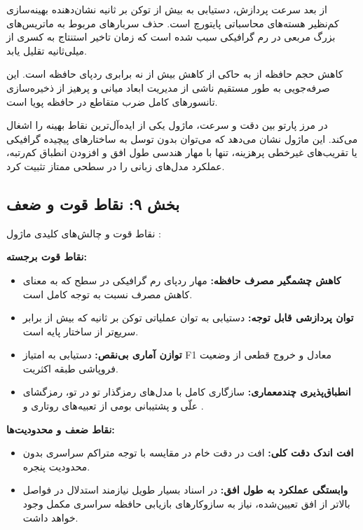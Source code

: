 از بعد سرعت پردازش، دستیابی به بیش از  توکن بر ثانیه نشان‌دهنده بهینه‌سازی کم‌نظیر هسته‌های محاسباتی پایتورچ است. حذف سربارهای مربوط به ماتریس‌های بزرگ مربعی در رم گرافیکی سبب شده است که زمان تاخیر استنتاج  به کسری از میلی‌ثانیه تقلیل یابد.

کاهش حجم حافظه از  به  حاکی از کاهش بیش از نه برابری ردپای حافظه است. این صرفه‌جویی به طور مستقیم ناشی از مدیریت ابعاد میانی و پرهیز از ذخیره‌سازی تانسورهای کامل ضرب متقاطع در حافظه پویا است.

در مرز پارتو بین دقت و سرعت، ماژول  یکی از ایده‌آل‌ترین نقاط بهینه را اشغال می‌کند. این ماژول نشان می‌دهد که می‌توان بدون توسل به ساختارهای پیچیده گرافیکی یا تقریب‌های غیرخطی پرهزینه، تنها با مهار هندسی طول افق و افزودن انطباق کم‌رتبه، عملکرد مدل‌های زبانی را در سطحی ممتاز تثبیت کرد.

\subsection*{بخش ۹: نقاط قوت و ضعف }
نقاط قوت و چالش‌های کلیدی ماژول :

\textbf{نقاط قوت برجسته:}
\begin{itemize}
    \item \textbf{کاهش چشمگیر مصرف حافظه:} مهار ردپای رم گرافیکی در سطح  که به معنای  کاهش مصرف نسبت به توجه کامل است.
    \item \textbf{توان پردازشی قابل توجه:} دستیابی به توان عملیاتی  توکن بر ثانیه که بیش از  برابر سریع‌تر از ساختار پایه است.
    \item \textbf{توازن آماری بی‌نقص:} دستیابی به امتیاز F1 معادل  و خروج قطعی از وضعیت فروپاشی طبقه اکثریت.
    \item \textbf{انطباق‌پذیری چندمعماری:} سازگاری کامل با مدل‌های رمزگذار تو در تو، رمزگشای علّی و پشتیبانی بومی از تعبیه‌های روتاری و .
\end{itemize}

\textbf{نقاط ضعف و محدودیت‌ها:}
\begin{itemize}
    \item \textbf{افت اندک دقت کلی:} افت  در دقت خام در مقایسه با توجه متراکم سراسری بدون محدودیت پنجره.
    \item \textbf{وابستگی عملکرد به طول افق:} در اسناد بسیار طویل نیازمند استدلال در فواصل بالاتر از افق تعیین‌شده، نیاز به سازوکارهای بازیابی حافظه سراسری مکمل وجود خواهد داشت.
\end{itemize}

